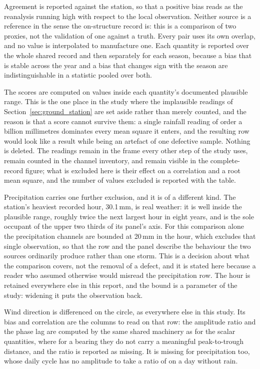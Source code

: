 \documentclass[11pt,a4paper]{article}
\begin{document}
Agreement is reported against the station, so that a positive bias reads as the
reanalysis running high with respect to the local observation. Neither source is
a reference in the sense the on-structure record is: this is a comparison of two
proxies, not the validation of one against a truth. Every pair uses its own
overlap, and no value is interpolated to manufacture one. Each quantity is
reported over the whole shared record and then separately for each season,
because a bias that is stable across the year and a bias that changes sign with
the season are indistinguishable in a statistic pooled over both.

The scores are computed on values inside each quantity's documented plausible
range. This is the one place in the study where the implausible readings of
Section~\ref{sec:ground_station} are set aside rather than merely counted, and
the reason is that a score cannot survive them: a single rainfall reading of
order a billion millimetres dominates every mean square it enters, and the
resulting row would look like a result while being an artefact of one defective
sample. Nothing is deleted. The readings remain in the frame every other step of
the study uses, remain counted in the channel inventory, and remain visible in
the complete-record figure; what is excluded here is their effect on a
correlation and a root mean square, and the number of values excluded is
reported with the table.

Precipitation carries one further exclusion, and it is of a different kind. The
station's heaviest recorded hour, 30.1\,mm, is real weather: it is well inside
the plausible range, roughly twice the next largest hour in eight years, and is
the sole occupant of the upper two thirds of its panel's axis. For this
comparison alone the precipitation channels are bounded at 20\,mm in the hour,
which excludes that single observation, so that the row and the panel describe
the behaviour the two sources ordinarily produce rather than one storm. This is
a decision about what the comparison covers, not the removal of a defect, and it
is stated here because a reader who assumed otherwise would misread the
precipitation row. The hour is retained everywhere else in this report, and the
bound is a parameter of the study: widening it puts the observation back.

Wind direction is differenced on the circle, as everywhere else in this study.
Its bias and correlation are the columns to read on that row: the amplitude ratio
and the phase lag are computed by the same shared machinery as for the scalar
quantities, where for a bearing they do not carry a meaningful peak-to-trough
distance, and the ratio is reported as missing. It is missing for precipitation
too, whose daily cycle has no amplitude to take a ratio of on a day without
rain.
\end{document}
